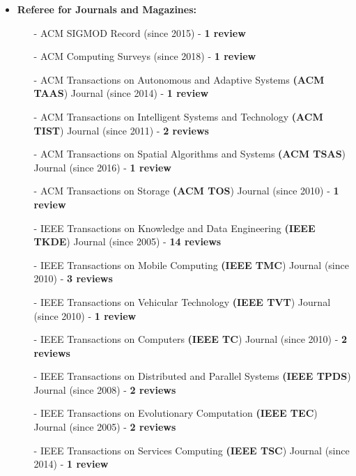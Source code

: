 \documentclass[10pt]{article}
\begin{document}
\begin{itemize}
\item {\bf Referee for Journals and Magazines:}
\begin{itemize}
\setlength{\itemsep}{0.10ex}
\item[-] ACM SIGMOD Record (since 2015) - {\bf 1 review}
\item[-] ACM Computing Surveys (since 2018) - {\bf 1 review}
\item[-] ACM Transactions on Autonomous and Adaptive Systems {\bf (ACM TAAS}) Journal (since 2014) - {\bf 1 review}
\item[-] ACM Transactions on Intelligent Systems and Technology {\bf (ACM TIST}) Journal (since 2011) - {\bf 2 reviews}
\item[-] ACM Transactions on Spatial Algorithms and Systems {\bf (ACM TSAS}) Journal (since 2016) - {\bf 1 review}
\item[-] ACM Transactions on Storage {\bf (ACM TOS}) Journal (since 2010) - {\bf 1 review}

\item[-] IEEE Transactions on Knowledge and Data Engineering {\bf (IEEE TKDE}) Journal (since 2005) - {\bf 14 reviews}
\item[-] IEEE Transactions on Mobile Computing {\bf (IEEE TMC}) Journal (since 2010) - {\bf 3 reviews}
\item[-] IEEE Transactions on Vehicular Technology {\bf (IEEE TVT}) Journal (since 2010) - {\bf 1 review}
\item[-] IEEE Transactions on Computers {\bf (IEEE TC}) Journal (since 2010) - {\bf 2 reviews}
\item[-] IEEE Transactions on Distributed and Parallel Systems {\bf (IEEE TPDS}) Journal (since 2008) - {\bf 2 reviews}

\item[-] IEEE Transactions on Evolutionary Computation {\bf (IEEE TEC}) Journal (since 2005) - {\bf 2 reviews}
\item[-] IEEE Transactions on Services Computing {\bf (IEEE TSC}) Journal (since 2014) - {\bf 1 review}


\end{itemize}
\end{itemize}
\end{document}
